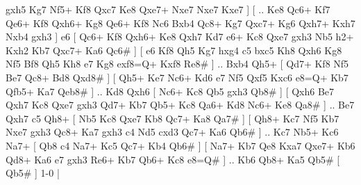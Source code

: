 gxh5 Kg7  Nf5+ Kf8  Qxc7 Ke8  Qxe7+ Nxe7  Nxe7 Kxe7   ]  [ .. Ke8  Qc6+ Kf7  Qe6+ Kf8  Qxh6+ Kg8  Qe6+ Kf8  Nc6 Bxb4  Qc8+ Kg7  Qxc7+ Kg6  Qxh7+ Kxh7  Nxb4 gxh3   ]  e6 [  Qc6+ Kf8  Qxh6+ Ke8  Qxh7 Kd7  e6+ Kc8  Qxe7 gxh3  Nb5 h2+  Kxh2 Kb7  Qxc7+ Ka6  Qc6#   ]  [  e6 Kf8  Qh5 Kg7  hxg4 c5  bxc5 Kh8  Qxh6 Kg8  Nf5 Bf8  Qh5 Kh8  e7 Kg8  exf8=Q+ Kxf8  Re8#   ] .. Bxb4    Qh5+ [  Qd7+ Kf8  Nf5 Be7  Qc8+ Bd8  Qxd8#   ]  [  Qh5+ Ke7  Nc6+ Kd6  e7 Nf5  Qxf5 Kxc6  e8=Q+ Kb7  Qfb5+ Ka7  Qeb8#   ] .. Kd8    Qxh6 [  Nc6+ Kc8  Qb5 gxh3  Qb8#   ]  [  Qxh6 Be7  Qxh7 Kc8  Qxe7 gxh3  Qd7+ Kb7  Qb5+ Kc8  Qa6+ Kd8  Nc6+ Ke8  Qa8#   ] .. Be7    Qxh7   c5    Qh8+ [  Nb5 Kc8  Qxe7 Kb8  Qc7+ Ka8  Qa7#   ]  [  Qh8+ Kc7  Nf5 Kb7  Nxe7 gxh3  Qc8+ Ka7  gxh3 c4  Nd5 cxd3  Qc7+ Ka6  Qb6#   ] .. Kc7    Nb5+   Kc6    Na7+ [  Qb8 c4  Na7+ Kc5  Qc7+ Kb4  Qb6#   ]  [  Na7+ Kb7  Qe8 Kxa7  Qxe7+ Kb6  Qd8+ Ka6  e7 gxh3  Re6+ Kb7  Qb6+ Kc8  e8=Q#   ] .. Kb6    Qb8+   Ka5    Qb5#    [  Qb5#   ] 1-0  |
